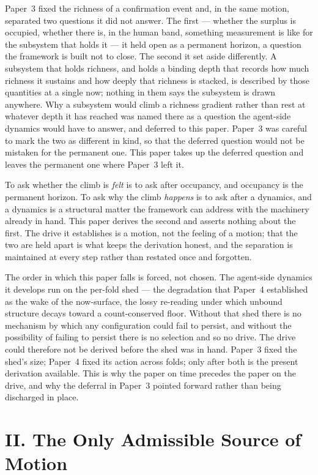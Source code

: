 \documentclass[11pt,oneside]{report}
\theoremstyle{definition}
\theoremstyle{remark}
\begin{document}
Paper~3 fixed the richness of a confirmation event and, in the same motion,
separated two questions it did not answer. The first --- whether the surplus is
occupied, whether there is, in the human band, something measurement is like for the
subsystem that holds it --- it held open as a permanent horizon, a question the
framework is built not to close. The second it set aside differently. A subsystem
that holds richness, and holds a binding depth that records how much richness it
sustains and how deeply that richness is stacked, is described by those quantities at
a single now; nothing in them says the subsystem is drawn anywhere. Why a subsystem
would climb a richness gradient rather than rest at whatever depth it has reached was
named there as a question the agent-side dynamics would have to answer, and deferred
to this paper. Paper~3 was careful to mark the two as different in kind, so that the
deferred question would not be mistaken for the permanent one. This paper takes up the
deferred question and leaves the permanent one where Paper~3 left it.

To ask whether the climb is \emph{felt} is to ask after occupancy, and occupancy
is the permanent horizon. To ask
why the climb \emph{happens} is to ask after a dynamics, and a dynamics is a
structural matter the framework can address with the machinery already in hand. This
paper derives the second and asserts nothing about the first. The drive it establishes
is a motion, not the feeling of a motion; that the two are held apart is what keeps the
derivation honest, and the separation is maintained at every step rather than restated
once and forgotten.

The order in which this paper falls is forced, not chosen. The agent-side dynamics it
develops run on the per-fold shed --- the degradation that Paper~4 established as the
wake of the now-surface, the lossy re-reading under which unbound structure decays
toward a count-conserved floor. Without that shed there is no mechanism by which any
configuration could fail to persist, and without the possibility of failing to persist
there is no selection and so no drive. The drive could therefore not be derived before
the shed was in hand. Paper~3 fixed the shed's size; Paper~4 fixed its action across
folds; only after both is the present derivation available. This is why the paper on
time precedes the paper on the drive, and why the deferral in Paper~3 pointed forward
rather than being discharged in place.

\section*{II. The Only Admissible Source of Motion}
\end{document}
